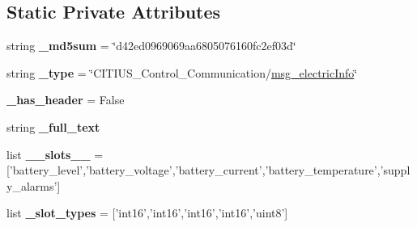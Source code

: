 \subsection*{\-Static \-Private \-Attributes}
\begin{DoxyCompactItemize}
\item 
\hypertarget{class_c_i_t_i_u_s___control___communication_1_1msg_1_1__msg__electric_info_1_1msg__electric_info_ae256bce7d41e470e1f5260f03e4d3513}{string {\bfseries \-\_\-md5sum} = \char`\"{}d42ed0969069aa6805076160fc2ef03d\char`\"{}}\label{class_c_i_t_i_u_s___control___communication_1_1msg_1_1__msg__electric_info_1_1msg__electric_info_ae256bce7d41e470e1f5260f03e4d3513}

\item 
\hypertarget{class_c_i_t_i_u_s___control___communication_1_1msg_1_1__msg__electric_info_1_1msg__electric_info_ad6b33e42d569f1469d4c2c4815fb5b14}{string {\bfseries \-\_\-type} = \char`\"{}\-C\-I\-T\-I\-U\-S\-\_\-\-Control\-\_\-\-Communication/\hyperlink{class_c_i_t_i_u_s___control___communication_1_1msg_1_1__msg__electric_info_1_1msg__electric_info}{msg\-\_\-electric\-Info}\char`\"{}}\label{class_c_i_t_i_u_s___control___communication_1_1msg_1_1__msg__electric_info_1_1msg__electric_info_ad6b33e42d569f1469d4c2c4815fb5b14}

\item 
\hypertarget{class_c_i_t_i_u_s___control___communication_1_1msg_1_1__msg__electric_info_1_1msg__electric_info_a2f280b629dc71a1198036174e5b00927}{{\bfseries \-\_\-has\-\_\-header} = \-False}\label{class_c_i_t_i_u_s___control___communication_1_1msg_1_1__msg__electric_info_1_1msg__electric_info_a2f280b629dc71a1198036174e5b00927}

\item 
string {\bfseries \-\_\-full\-\_\-text}
\item 
\hypertarget{class_c_i_t_i_u_s___control___communication_1_1msg_1_1__msg__electric_info_1_1msg__electric_info_ae126885e424343a7c64adb13aefcf17b}{list {\bfseries \-\_\-\-\_\-slots\-\_\-\-\_\-} = \mbox{[}'battery\-\_\-level','battery\-\_\-voltage','battery\-\_\-current','battery\-\_\-temperature','supply\-\_\-alarms'\mbox{]}}\label{class_c_i_t_i_u_s___control___communication_1_1msg_1_1__msg__electric_info_1_1msg__electric_info_ae126885e424343a7c64adb13aefcf17b}

\item 
\hypertarget{class_c_i_t_i_u_s___control___communication_1_1msg_1_1__msg__electric_info_1_1msg__electric_info_aa4a53a9bca1cff7974d4beb1eabb9027}{list {\bfseries \-\_\-slot\-\_\-types} = \mbox{[}'int16','int16','int16','int16','uint8'\mbox{]}}\label{class_c_i_t_i_u_s___control___communication_1_1msg_1_1__msg__electric_info_1_1msg__electric_info_aa4a53a9bca1cff7974d4beb1eabb9027}

\end{DoxyCompactItemize}


